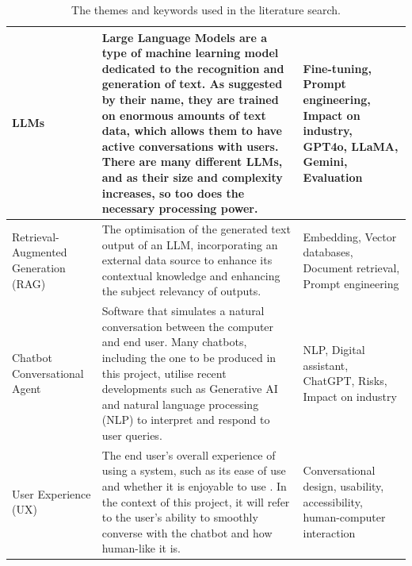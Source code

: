 \documentclass[12pt]{report}
\begin{document}
\begin{table}[H]
\begin{tabular}{|p{}|p{} | p{}|}
            \\

            \hline
            
            LLMs & Large Language Models are a type of machine learning model dedicated to the recognition and generation of text.
            As suggested by their name, they are trained on enormous amounts of text data, which allows them 
            to have active conversations with users. There are many different LLMs, and as their size and 
            complexity increases, so too does the necessary processing power. &
            Fine-tuning, Prompt engineering, Impact on industry,
            GPT4o, LLaMA, Gemini, Evaluation
            
            \\
            \hline 

            Retrieval-Augmented Generation \newline (RAG) & The optimisation of the generated text output of an LLM, incorporating
            an external data source to enhance its contextual knowledge and enhancing the subject relevancy of outputs.
            & Embedding, Vector databases, Document retrieval, Prompt engineering\\

            \hline
            Chatbot \newline Conversational Agent & Software that simulates a natural conversation between the 
            computer and end user. Many chatbots, including the one to be produced in this project, utilise recent
            developments such as Generative AI and natural language processing (NLP) to interpret and respond to user queries.
            \autocite{IBMChatbotDef}
            & NLP, Digital assistant, ChatGPT, Risks, Impact on industry \\

            \hline

            User Experience (UX) & The end user's overall experience of using a system, such as its ease of use and 
            whether it is enjoyable to use \autocite{UXDict}. In the context of this project, it will refer to the user's 
            ability to smoothly converse with the chatbot and how human-like it is. 
            & Conversational design, usability, accessibility, human-computer interaction

            \\

            \hline 

        \end{tabular}
        \caption{The themes and keywords used in the literature search.}
        \label{tab:themes}
    \end{table}
\end{document}
